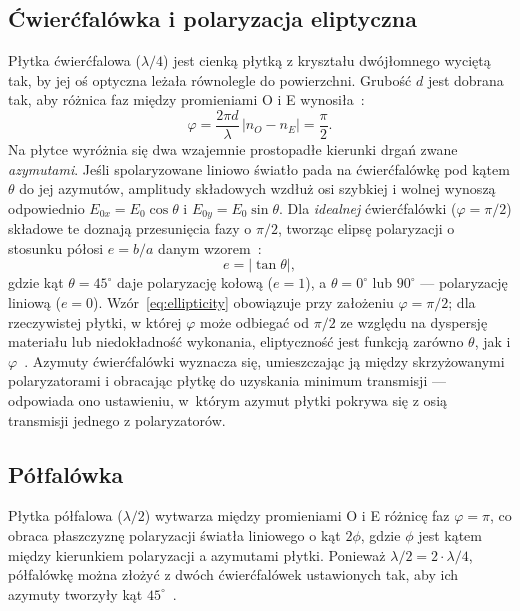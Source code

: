 \documentclass[12pt, a4paper]{article}
\begin{document}
\subsection{Ćwierćfalówka i polaryzacja eliptyczna}

Płytka ćwierćfalowa ($\lambda/4$) jest cienką płytką z kryształu dwójłomnego wyciętą tak,
by jej oś optyczna leżała równolegle do powierzchni. Grubość $d$ jest dobrana tak, aby
różnica faz między promieniami O i E wynosiła~\cite{skrypt}:
\begin{equation}
    \varphi = \frac{2\pi d}{\lambda}\,|n_O - n_E| = \frac{\pi}{2}.
    \label{eq:qwp}
\end{equation}
Na płytce wyróżnia się dwa wzajemnie prostopadłe kierunki drgań zwane \emph{azymutami}.
Jeśli spolaryzowane liniowo światło pada na ćwierćfalówkę pod kątem $\theta$
do jej azymutów, amplitudy składowych wzdłuż osi szybkiej i wolnej wynoszą
odpowiednio $E_{0x} = E_0\cos\theta$ i $E_{0y} = E_0\sin\theta$.
Dla \emph{idealnej} ćwierćfalówki ($\varphi = \pi/2$) składowe te doznają
przesunięcia fazy o $\pi/2$, tworząc elipsę polaryzacji o stosunku półosi
$e = b/a$ danym wzorem~\cite{skrypt}:
\begin{equation}
    e = |\tan\theta|,
    \label{eq:ellipticity}
\end{equation}
gdzie kąt $\theta = 45^{\circ}$ daje polaryzację kołową ($e = 1$), a $\theta = 0^{\circ}$
lub $90^{\circ}$ --- polaryzację liniową ($e = 0$).
Wzór~\eqref{eq:ellipticity} obowiązuje przy założeniu $\varphi = \pi/2$;
dla rzeczywistej płytki, w której $\varphi$ może odbiegać od $\pi/2$ ze względu
na dyspersję materiału lub niedokładność wykonania, eliptyczność jest funkcją
zarówno $\theta$, jak i $\varphi$~\cite{skrypt}.
Azymuty ćwierćfalówki wyznacza się, umieszczając ją między skrzyżowanymi polaryzatorami
i obracając płytkę do uzyskania minimum transmisji --- odpowiada ono ustawieniu,
w~którym azymut płytki pokrywa się z osią transmisji jednego z polaryzatorów.

\subsection{Półfalówka}

Płytka półfalowa ($\lambda/2$) wytwarza między promieniami O i E różnicę faz $\varphi = \pi$,
co obraca płaszczyznę polaryzacji światła liniowego o kąt $2\phi$, gdzie $\phi$ jest
kątem między kierunkiem polaryzacji a azymutami płytki. Ponieważ $\lambda/2 = 2\cdot\lambda/4$,
półfalówkę można złożyć z dwóch ćwierćfalówek ustawionych tak, aby ich azymuty
tworzyły kąt $45^{\circ}$~\cite{skrypt}.
\end{document}
